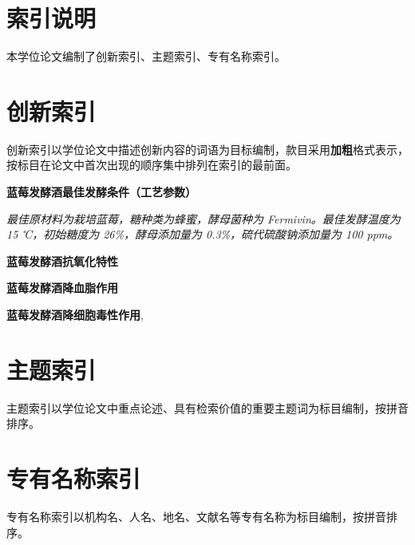 
\begin{bnuindex}

\section*{索引说明}
本学位论文编制了创新索引、主题索引、专有名称索引。

\section*{创新索引}
创新索引以学位论文中描述创新内容的词语为目标编制，款目采用\textbf{加粗}格式表示，按标目在论文中首次出现的顺序集中排列在索引的最前面。

\vspace{1em}
\textbf{蓝莓发酵酒最佳发酵条件（工艺参数）}\dotfill\pageref{idx:innov:ferment}

\textit{最佳原材料为栽培蓝莓，糖种类为蜂蜜，酵母菌种为 Fermivin。最佳发酵温度为 15 ℃，初始糖度为 26\%，酵母添加量为 0.3\%，硫代硫酸钠添加量为 100 ppm。}

\textbf{蓝莓发酵酒抗氧化特性}\dotfill\pageref{idx:innov:antioxi}

\textbf{蓝莓发酵酒降血脂作用}\dotfill\pageref{idx:innov:lipid}

\textbf{蓝莓发酵酒降细胞毒性作用}\dotfill\pageref{idx:innov:lipid}, \pageref{idx:innov:antioxi} 


\section*{主题索引}
主题索引以学位论文中重点论述、具有检索价值的重要主题词为标目编制，按拼音排序。

\vspace{1em}



\section*{专有名称索引}
专有名称索引以机构名、人名、地名、文献名等专有名称为标目编制，按拼音排序。

\vspace{1em}


\end{bnuindex}